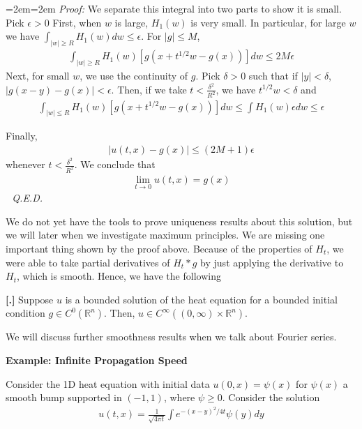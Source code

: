 \documentclass{article}
\newcommand{\R}{{\mathbb{R}}}
\newcounter{result}[section]
\newenvironment{res}[1][]{\refstepcounter{result}\par\medskip
	\noindent \textbf{[\thesection.\theresult] #1} \rmfamily}{\medskip}
\newenvironment{pf}{%
	\par%
	\medskip
	\leftskip=2em\rightskip=2em%
	\noindent\ignorespaces \textit{Proof:} \newline}{%
	\,\, \newline \textit{Q.E.D.}\par\medskip}
\begin{document}
\begin{pf}
		We separate this integral into two parts to show it is small. Pick $\epsilon > 0$ First, when $w$ is large, $H_{1}(w)$ is very small. In particular, for large $w$ we have $\int_{|w|\geq R} H_{1}(w)dw \leq \epsilon$. For $|g| \leq M$,
		\begin{align*}
			\int_{|w| \geq R} H_{1}(w)\left[g(x+t^{1/2}w - g(x)) \right]dw \leq 2M\epsilon
		\end{align*}
		Next, for small $w$, we use the continuity of $g$. Pick $\delta > 0$ such that if $|y| < \delta$, $|g(x-y) - g(x)| < \epsilon$. Then, if we take $t < \frac{\delta^{2}}{R^{2}}$, we have $t^{1/2}w < \delta$ and 
		\begin{align*}
			\int_{|w| \leq R}  H_{1}(w)\left[g(x+t^{1/2}w - g(x)) \right]dw \leq \int H_{1}(w) \epsilon dw \leq \epsilon
		\end{align*}
		
		Finally, 
		\begin{align*}
			|u(t,x) - g(x)| \leq (2M+1)\epsilon
		\end{align*}
		whenever $t < \frac{\delta^{2}}{R^{2}}$. We conclude that 
		\begin{align*}
			\lim_{t \to 0} u(t,x) = g(x)
		\end{align*}
	\end{pf}
	
	We do not yet have the tools to prove uniqueness results about this solution, but we will later when we investigate maximum principles. We are missing one important thing shown by the proof above. Because of the properties of $H_{t}$, we were able to take partial derivatives of $H_{t} * g$ by just applying the derivative to $H_{t}$, which is smooth. Hence, we have the following
	
	\begin{res}
		Suppose $u$ is a bounded solution of the heat equation for a bounded initial condition $g \in C^{0}(\R^{n})$. Then, $u \in C^{\infty}((0,\infty) \times \R^{n})$. 
	\end{res}
	
	We will discuss further smoothness results when we talk about Fourier series. 
	
	
	\vspace{0.25 cm}
	
	\textbf{Example: Infinite Propagation Speed}
	
	Consider the 1D heat equation with initial data $u(0,x) = \psi(x)$ for $\psi(x)$ a smooth bump supported in $(-1,1)$, where $\psi \geq 0$. Consider the solution 
	\begin{align*}
		u(t,x) = \frac{1}{\sqrt{4 \pi t}} \int e^{-(x-y)^{2}/4t} \psi(y) dy
	\end{align*}
	
\end{document}
